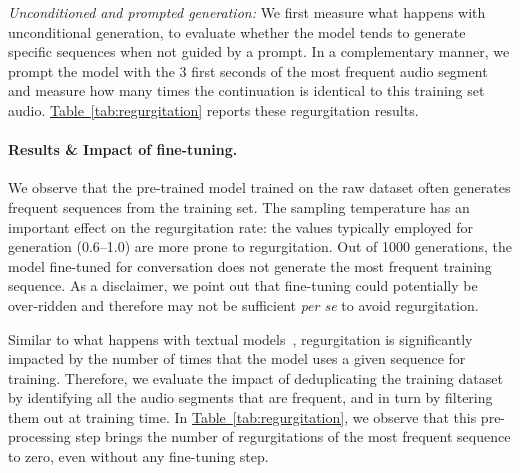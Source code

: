 \noindent \textit{Unconditioned and prompted generation:} We first measure what happens with unconditional generation, to evaluate whether the model tends to generate specific sequences when not guided by a prompt. In a complementary manner, we prompt the model with the 3 first seconds of the most frequent audio segment and measure how many times the continuation is identical to this training set audio. 
\hyperref[tab:regurgitation]{Table~\ref{tab:regurgitation}} reports these regurgitation results.



\paragraph{Results \& Impact of fine-tuning.} 
 We observe that the pre-trained model trained on the raw dataset often generates frequent sequences from the training set. The sampling temperature has an important effect on the regurgitation rate: the values typically employed for generation (0.6--1.0) are more prone to regurgitation. Out of 1000 generations, the model fine-tuned  for conversation does not generate the most frequent training sequence. As a disclaimer, we point out that fine-tuning could potentially be over-ridden and therefore may not be sufficient \emph{per se} to avoid regurgitation. 

Similar to what happens with textual models~\citep{carlini2022quantifying}, regurgitation is significantly impacted by the number of times that the model uses a given sequence for training. 
Therefore, we evaluate the impact of deduplicating the training dataset by identifying all the audio segments that are frequent, and in turn by filtering them out at training time. 
In \hyperref[tab:regurgitation]{Table~\ref{tab:regurgitation}}, we observe that this pre-processing step brings the number of regurgitations of the most frequent sequence to zero, even without any fine-tuning step. %


